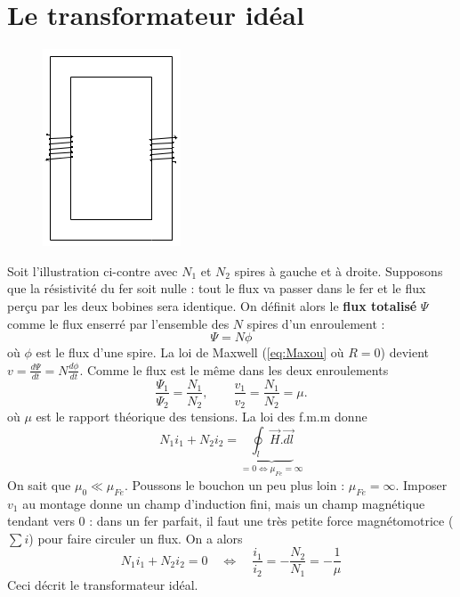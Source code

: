 \section{Le transformateur idéal}
		\begin{figure}
		\vspace{-5mm}
		\includegraphics[scale=0.4]{ch3/image1.png}
		\end{figure}
Soit l'illustration ci-contre avec $N_1$ et $N_2$ spires à gauche 
et à droite. Supposons que la résistivité du fer soit nulle : tout 
le flux va passer dans le fer et le flux perçu par les deux bobines 
sera identique. On définit alors le \textbf{flux totalisé} $\Psi$ 
comme le flux enserré par l'ensemble des $N$ spires d'un enroulement :
\begin{equation}
\Psi = N\phi
\end{equation}
où $\phi$ est le flux d'une spire. La loi de Maxwell (\autoref{eq:Maxou} 
où $R=0$) devient $v = \frac{d\Psi}{dt} = N\frac{d\phi}{dt}$. Comme le flux 
est le même dans les deux enroulements
\begin{equation}
\frac{\Psi_1}{\Psi_2} = \dfrac{N_1}{N_2},\qquad \frac{v_1}{v_2} = 
\frac{N_1}{N_2} = \mu.
\end{equation}
où $\mu$ est le rapport théorique des tensions. La loi des f.m.m 
donne
\begin{equation}
N_1i_1 + N_2i_2 = \underbrace{\oint_l \vec{H}.\vec{dl}}_{=0
\Leftrightarrow \mu_{Fe}=\infty}
\end{equation}
On sait que $\mu_0 \ll \mu_{Fe}$. Poussons le bouchon un peu plus 
loin : $\mu_{Fe} = \infty$. Imposer $v_1$ au montage donne un champ 
d'induction fini, mais un champ magnétique tendant vers 0 : dans un 
fer parfait, il faut une très petite force magnétomotrice ($\sum i$) 
pour faire circuler un flux. On a alors
\begin{equation}
N_1i_1 + N_2i_2 =0\quad\Leftrightarrow\quad \frac{i_1}{i_2} = -
\frac{N_2}{N_1} = -\frac{1}{\mu}
\end{equation}
Ceci décrit le transformateur idéal.

